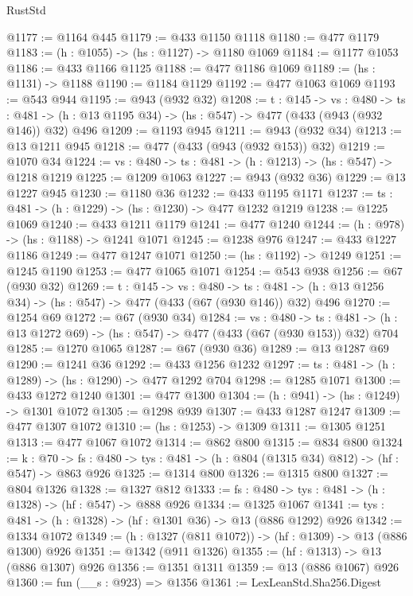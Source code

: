 \begin{lexlean}{RustStd}
\begin{coremodule}
{\begin{coremodule}
{{{{{{{@1177 := @1164 @445
@1179 := @433 @1150 @1118
@1180 := @477 @1179
@1183 := (h : @1055) -> (hs : @1127) -> @1180 @1069
@1184 := @1177 @1053
@1186 := @433 @1166 @1125
@1188 := @477 @1186 @1069
@1189 := (hs : @1131) -> @1188
@1190 := @1184 @1129
@1192 := @477 @1063 @1069
@1193 := @543 @944
@1195 := @943 (@932 @32)
@1208 := {t : @145} ->
  {vs : @480} ->
  {ts : @481} -> (h : @13 @1195 @34) -> (hs : @547) -> @477 (@433 (@943 (@932 @146)) @32) @496
@1209 := @1193 @945
@1211 := @943 (@932 @34)
@1213 := @13 @1211 @945
@1218 := @477 (@433 (@943 (@932 @153)) @32)
@1219 := @1070 @34
@1224 := {vs : @480} -> {ts : @481} -> (h : @1213) -> (hs : @547) -> @1218 @1219
@1225 := @1209 @1063
@1227 := @943 (@932 @36)
@1229 := @13 @1227 @945
@1230 := @1180 @36
@1232 := @433 @1195 @1171
@1237 := {ts : @481} -> (h : @1229) -> (hs : @1230) -> @477 @1232 @1219
@1238 := @1225 @1069
@1240 := @433 @1211 @1179
@1241 := @477 @1240
@1244 := (h : @978) -> (hs : @1188) -> @1241 @1071
@1245 := @1238 @976
@1247 := @433 @1227 @1186
@1249 := @477 @1247 @1071
@1250 := (hs : @1192) -> @1249
@1251 := @1245 @1190
@1253 := @477 @1065 @1071
@1254 := @543 @938
@1256 := @67 (@930 @32)
@1269 := {t : @145} ->
  {vs : @480} ->
  {ts : @481} -> (h : @13 @1256 @34) -> (hs : @547) -> @477 (@433 (@67 (@930 @146)) @32) @496
@1270 := @1254 @69
@1272 := @67 (@930 @34)
@1284 := {vs : @480} ->
  {ts : @481} -> (h : @13 @1272 @69) -> (hs : @547) -> @477 (@433 (@67 (@930 @153)) @32) @704
@1285 := @1270 @1065
@1287 := @67 (@930 @36)
@1289 := @13 @1287 @69
@1290 := @1241 @36
@1292 := @433 @1256 @1232
@1297 := {ts : @481} -> (h : @1289) -> (hs : @1290) -> @477 @1292 @704
@1298 := @1285 @1071
@1300 := @433 @1272 @1240
@1301 := @477 @1300
@1304 := (h : @941) -> (hs : @1249) -> @1301 @1072
@1305 := @1298 @939
@1307 := @433 @1287 @1247
@1309 := @477 @1307 @1072
@1310 := (hs : @1253) -> @1309
@1311 := @1305 @1251
@1313 := @477 @1067 @1072
@1314 := @862 @800
@1315 := @834 @800
@1324 := {k : @70} ->
  {fs : @480} -> {tys : @481} -> (h : @804 (@1315 @34) @812) -> (hf : @547) -> @863 @926
@1325 := @1314 @800
@1326 := @1315 @800
@1327 := @804 @1326
@1328 := @1327 @812
@1333 := {fs : @480} -> {tys : @481} -> (h : @1328) -> (hf : @547) -> @888 @926
@1334 := @1325 @1067
@1341 := {tys : @481} -> (h : @1328) -> (hf : @1301 @36) -> @13 (@886 @1292) @926
@1342 := @1334 @1072
@1349 := (h : @1327 (@811 @1072)) -> (hf : @1309) -> @13 (@886 @1300) @926
@1351 := @1342 (@911 @1326)
@1355 := (hf : @1313) -> @13 (@886 @1307) @926
@1356 := @1351 @1311
@1359 := @13 (@886 @1067) @926
@1360 := fun (__s : @923) => @1356
@1361 := LexLeanStd.Sha256.Digest
}}}}}}}
\end{coremodule}}
\end{coremodule}
\end{lexlean}
